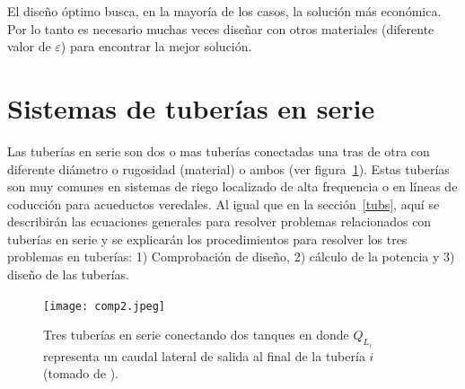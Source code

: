 \documentclass[10pt, oneside]{article}
\begin{document}
El dise\~no \'optimo busca, en la mayor\'ia de los casos, la soluci\'on m\'as econ\'omica. Por lo tanto es necesario muchas veces dise\~nar con otros materiales (diferente valor de $\varepsilon$) para encontrar  la mejor soluci\'on.
 

\section{Sistemas de tuber\'ias en serie} 
Las tuber\'ias en serie son dos o mas tuber\'ias conectadas una tras de otra con diferente di\'ametro o rugosidad (material) o ambos (ver figura~\ref{ttuse}). Estas tuber\'ias son muy comunes en sistemas de riego localizado de alta frequencia o en l\'ineas de coducci\'on para acueductos veredales. Al igual que en la secci\'on~\ref{tubs}, aqu\'i se describir\'an las ecuaciones generales para resolver problemas relacionados con tuber\'ias en serie y se explicar\'an los procedimientos para resolver los tres problemas en tuber\'ias: 1) Comprobaci\'on de dise\~no, 2) c\'alculo de la potencia y 3) dise\~no de las tuber\'ias.

\begin{figure}[h]
\centering
\texttt{[image: comp2.jpeg]}
\caption{Tres tuber\'ias en serie conectando dos tanques en donde $Q_{L_i}$ representa un caudal lateral de salida al final de la tuber\'ia $i$ (tomado de \cite{saldarriaga}).} 
\label{ttuse}
\end{figure}
\end{document}

